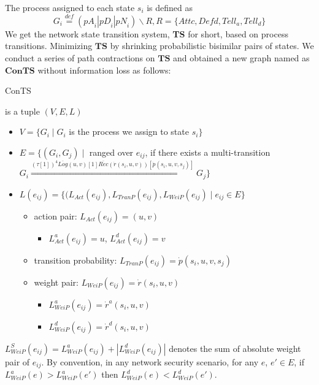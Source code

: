 \documentclass{acm_proc_article-sp}
\begin{document}
The process assigned to each state $s_{\textit{i}}$ is defined as $$G_{\textit{i}}\stackrel{\textit{def}}{=}(\textit{pA}_i|\textit{pD}_i|\textit{pN}_i) \backslash R, R=\{Attc,\textit{Defd},Tell_a,Tell_d\}$$
We get the network state transition system, \textbf{TS} for short, based on process transitions. Minimizing $\mathbf{TS}$ by shrinking probabilistic bisimilar pairs of states. We conduct a series of path contractions on $\mathbf{TS}$ and obtained a new graph named as $\mathbf{ConTS}$ without information loss as follows:
\begin{definition}
\begin{bf}ConTS\end{bf} is a tuple $(V,E,L)$
\begin{itemize}
\item $V=\{G_{\textit{i}}\mid G_{\textit{i}}$ is the process we assign to state $s_{\textit{i}}\}$
\item $E=\{(G_i, G_{j})\mid$ ranged over $e_{\textit{ij}}$, if there exists a multi-transition $G_{\textit{i}}\stackrel{(\tau[1])^{4} \overline{Log}(u,v)[1]\overline {Rec}(\dot{r}(s_{\textit{i}},u,v))[\dot{p}(s_{\textit{i}},u,v,s_{\textit{j}})]} {\Longrightarrow}G_j\}$
\item $L(e_{\textit{ij}})=\{(L_{\textit{Act}}(e_{\textit{ij}}), L_{\textit{TranP}}(e_{\textit{ij}}),L_{\textit{WeiP}}(e_{\textit{ij}}) \mid e_{\textit{ij}} \in E\}$
\begin{itemize}
\item action pair: $L_{\textit{Act}}(e_{\textit{ij}})=(u,v)$
\begin{itemize}
\item $L_{\textit{Act}}^a(e_{\textit{ij}})=u$, $L_{\textit{Act}}^d(e_{\textit{ij}})=v$
\end{itemize}
\item transition probability: $L_{\textit{TranP}}(e_{\textit{ij}})=\dot{p} (s_{\textit{i}},u,v,s_{\textit{j}})$
\item weight pair: $L_{\textit{WeiP}}(e_{\textit{ij}})=\dot{r}(s_{\textit{i}},u,v)$
\begin{itemize}
\item $L_{\textit{WeiP}}^a(e_{\textit{ij}})=\dot{r}^a(s_{\textit{i}},u,v)$
\item  $L_{\textit{WeiP}}^d(e_{\textit{ij}})=\dot{r}^d(s_{\textit{i}},u,v)$
\end{itemize}
\end{itemize}
\end{itemize}
\end{definition}
$L_{\textit{WeiP}}^S(e_{\textit{ij}})=L_{\textit{WeiP}}^a(e_{\textit{ij}})
+|L_{\textit{WeiP}}^d(e_{\textit{ij}})|$ denotes the sum of absolute weight pair of $e_{\textit{ij}}$.
By convention, in any network security scenario, for any $e$, $e'\in E$, if $L_{\textit{WeiP}}^a(e)>L_{\textit{WeiP}}^a(e')$ then $L_{\textit{WeiP}}^d(e)<L_{\textit{WeiP}}^d(e')$.
\end{document}
